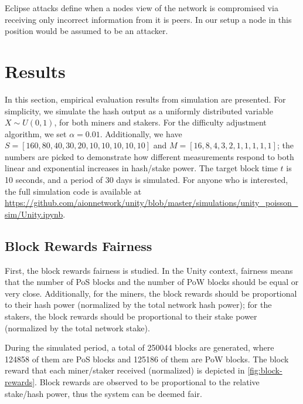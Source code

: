 \documentclass[a4paper]{article}
\begin{document}
Eclipse attacks define when a nodes view of the network is compromised via receiving only incorrect information from it is peers. In our setup a node in this position would be assumed to be an attacker.

\section{Results}

In this section, empirical evaluation results from simulation are presented. For simplicity, we simulate the hash output as a uniformly distributed variable $X \sim U(0, 1)$, for both miners and stakers. For the difficulty adjustment algorithm, we set $\alpha = 0.01$. Additionally, we have $S = [160, 80, 40, 30, 20, 10, 10, 10, 10, 10]$ and $M = [16, 8, 4, 3, 2, 1, 1, 1, 1, 1]$; the numbers are picked to demonstrate how different measurements respond to both linear and exponential increases in hash/stake power. The target block time $t$ is 10 seconds, and a period of 30 days is simulated. For anyone who is interested, the full simulation code is available at \url{https://github.com/aionnetwork/unity/blob/master/simulations/unity_poisson_sim/Unity.ipynb}.

\subsection{Block Rewards Fairness}

First, the block rewards fairness is studied. In the Unity context, fairness means that the number of PoS blocks and the number of PoW blocks should be equal or very close. Additionally, for the miners, the block rewards should be proportional to their hash power (normalized by the total network hash power); for the stakers, the block rewards should be proportional to their stake power (normalized by the total network stake).

During the simulated period, a total of 250044 blocks are generated, where 124858 of them are PoS blocks and 125186 of them are PoW blocks. The block reward that each miner/staker received (normalized) is depicted in \cref{fig:block-rewards}. Block rewards are observed to be proportional to the relative stake/hash power, thus the system can be deemed fair.
\end{document}
